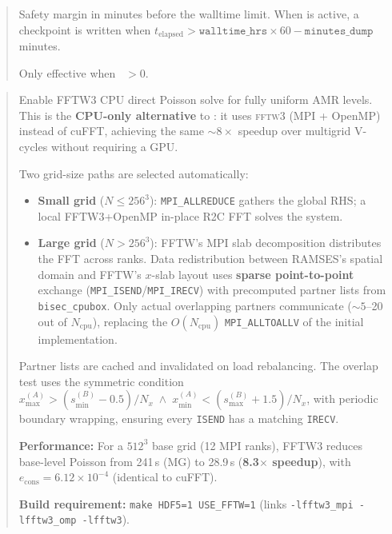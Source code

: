 \label{param:minutes_dump}

\begin{quote}
Safety margin in minutes before the walltime limit.  When
 is active, a checkpoint is written when
$t_{\text{elapsed}} > \texttt{walltime\_hrs} \times 60 -
\texttt{minutes\_dump}$ minutes.

Only effective when ~$> 0$.
\end{quote}


\label{param:use_fftw}

\begin{quote}
Enable FFTW3 CPU direct Poisson solve for fully uniform AMR levels.
This is the \textbf{CPU-only alternative} to :
it uses \textsc{fftw3} (MPI + OpenMP) instead of cuFFT, achieving
the same ${\sim}8\times$ speedup over multigrid V-cycles without
requiring a GPU.

Two grid-size paths are selected automatically:
\begin{itemize}[nosep]
  \item \textbf{Small grid} ($N \le 256^3$): \texttt{MPI\_ALLREDUCE}
        gathers the global RHS; a local FFTW3+OpenMP in-place R2C
        FFT solves the system.
  \item \textbf{Large grid} ($N > 256^3$): FFTW's MPI slab
        decomposition distributes the FFT across ranks.  Data
        redistribution between RAMSES's spatial domain and FFTW's
        $x$-slab layout uses \textbf{sparse point-to-point} exchange
        (\texttt{MPI\_ISEND}/\texttt{MPI\_IRECV}) with precomputed
        partner lists from \texttt{bisec\_cpubox}.  Only actual
        overlapping partners communicate (${\sim}5$--20 out of
        $N_{\text{cpu}}$), replacing the $O(N_{\text{cpu}})$
        \texttt{MPI\_ALLTOALLV} of the initial implementation.
\end{itemize}

Partner lists are cached and invalidated on load rebalancing.  The
overlap test uses the symmetric condition
$x_{\max}^{(A)} > (s_{\min}^{(B)} - 0.5) / N_x \;\wedge\;
x_{\min}^{(A)} < (s_{\max}^{(B)} + 1.5) / N_x$,
with periodic boundary wrapping, ensuring every \texttt{ISEND} has a
matching \texttt{IRECV}.

\textbf{Performance:} For a $512^3$ base grid (12 MPI ranks),
FFTW3 reduces base-level Poisson from 241\,s (MG) to 28.9\,s
(\textbf{8.3$\times$ speedup}), with $e_{\text{cons}} = 6.12 \times
10^{-4}$ (identical to cuFFT).

\textbf{Build requirement:} \texttt{make HDF5=1 USE\_FFTW=1}
(links \texttt{-lfftw3\_mpi -lfftw3\_omp -lfftw3}).

\end{quote}

